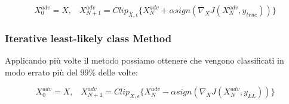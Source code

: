 \[
X_0^{adv} = X,  \;\;\; X_{N+1}^{adv} = Clip_{X, \epsilon}\{X_N^{adv} + \alpha sign(\nabla_XJ(X_{N}^{adv}, y_{true}))\}
\]

\subsubsection{Iterative least-likely class Method}
Applicando più volte il metodo  possiamo ottenere  che vengono classificati in modo errato più del \(99\%\) delle volte:

\[
X_0^{adv} = X, \;\;\; X_{N+1}^{adv} = Clip_{X, \epsilon}\{X_N^{adv} - \alpha sign(\nabla_XJ(X_N^{adv}, y_{LL}))\}
\]


